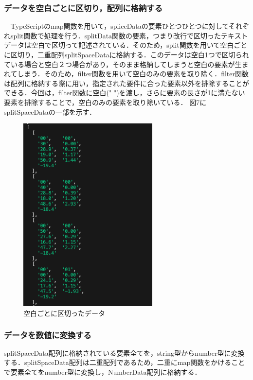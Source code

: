  \subsubsection{データを空白ごとに区切り，配列に格納する}
　TypeScriptのmap関数を用いて，spliceDataの要素ひとつひとつに対してそれぞれsplit関数で処理を行う．splitData関数の要素，つまり改行で区切ったテキストデータは空白で区切って記述されている．そのため，split関数を用いて空白ごとに区切り，二重配列splitSpaceDataに格納する．このデータは空白1つで区切られている場合と空白２つ場合があり，そのまま格納してしまうと空白の要素が生まれてしまう．そのため，filter関数を用いて空白のみの要素を取り除く．filter関数は配列に格納する際に用い，指定された要件に合った要素以外を排除することができる．今回は，filter関数に空白(" ")を渡し，さらに要素の長さが1に満たない要素を排除することで，空白のみの要素を取り除いている．
 図7にsplitSpaceDataの一部を示す．
 \begin{figure}[h]
   \centering
   \includegraphics[width=70mm]{fig/splitSpaceData.png}
   \caption{空白ごとに区切ったデータ}
 \end{figure}
 
 \subsubsection{データを数値に変換する}
 splitSpaceData配列に格納されている要素全てを，string型からnumber型に変換する．splitSpaceData配列は二重配列であるため，二重にmap関数をかけることで要素全てをnumber型に変換し，NumberData配列に格納する．
 
